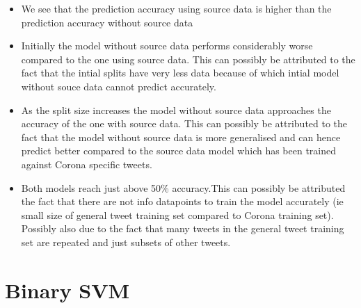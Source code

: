 \documentclass[12pt]{article}
\begin{document}
\begin{enumerate}[label=(\alph*)]
\begin{enumerate}[label=\roman*.]
    \begin{itemize}
        \item We see that the prediction accuracy using source data is higher than the prediction accuracy without source data
        \item Initially the model without source data performs considerably worse compared to the one using source data. This can possibly be attributed to the fact that the intial splits have very less data because of which intial model without souce data cannot predict accurately.
        \item As the split size increases the model without source data approaches the accuracy of the one with source data. This can possibly be attributed to the fact that the model without source data is more generalised and can hence predict better compared to the source data model which has been trained against Corona specific tweets.
        \item Both models reach just above 50\% accuracy.This can possibly be attributed the fact that there are not info datapoints to train the model accurately (ie small size of general tweet training set compared to Corona training set). Possibly also due to the fact that many tweets in the general tweet training set are repeated and just subsets of other tweets.

    \end{itemize}
\end{enumerate}


\end{enumerate}

\clearpage

\section{Binary SVM}
\end{document}
